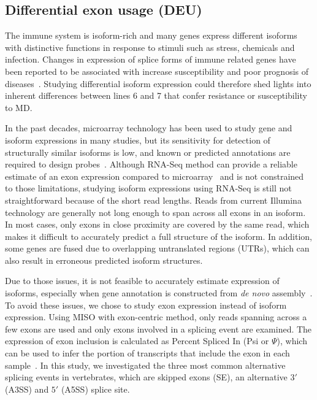 \documentclass[10pt]{article}
\begin{document}
\subsection*{Differential exon usage (DEU)}

The immune system is isoform-rich and many genes express different isoforms with
distinctive functions in response to stimuli such as stress, chemicals and
infection.  Changes in expression of splice forms of immune related genes have
been reported to be associated with increase susceptibility and poor prognosis
of diseases~\cite{lynch2004consequences}.  Studying differential isoform
expression could therefore shed lights into inherent differences between lines 6
and 7 that confer resistance or susceptibility to MD.

In the past decades, microarray technology has been used to study gene and
isoform expressions in many studies, but its sensitivity for detection of
structurally similar isoforms is low, and known or predicted annotations are
required to design probes~\cite{kane2000assessment}.  Although RNA-Seq method
can provide a reliable estimate of an exon expression compared to
microarray~\cite{pan2008deep} and is not constrained to those limitations,
studying isoform expressions using RNA-Seq is still not straightforward because
of the short read lengths.  Reads from current Illumina technology are generally
not long enough to span across all exons in an isoform.  In most cases, only
exons in close proximity are covered by the same read, which makes it difficult
to accurately predict a full structure of the isoform.  In addition, some genes
are fused due to overlapping untranslated regions (UTRs), which can also result
in erroneous predicted isoform structures.

Due to those issues, it is not feasible to accurately estimate expression of
isoforms, especially when gene annotation is constructed from {\em de novo}
assembly~\cite{trapnell2013differential}.  To avoid these issues, we chose to
study exon expression instead of isoform expression.  Using MISO with
exon-centric method, only reads spanning across a few exons are used and only
exons involved in a splicing event are examined.  The expression of exon
inclusion is calculated as Percent Spliced In (Psi or $\Psi$), which can be used
to infer the portion of transcripts that include the exon in each
sample~\cite{Katz:2010iv}.  In this study, we investigated the three most common
alternative splicing events in vertebrates, which are skipped exons (SE), an
alternative $3\prime$ (A3SS) and $5\prime$ (A5SS) splice site.
\end{document}
